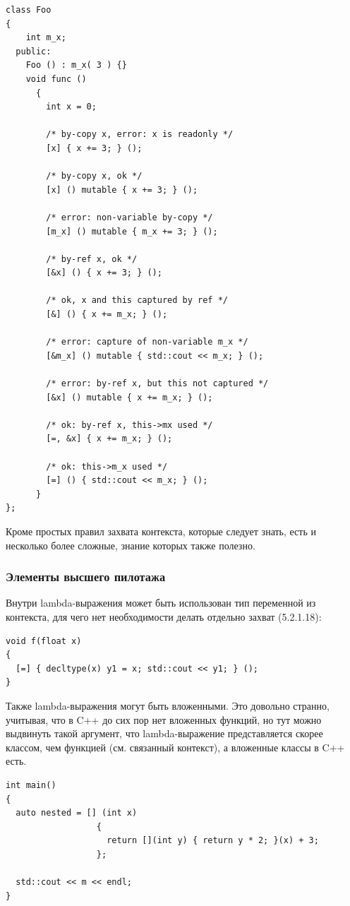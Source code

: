\documentclass[a4paper,12pt,oneside]{article}
\begin{document}
\begin{lstlisting}
class Foo
{
    int m_x;
  public:
    Foo () : m_x( 3 ) {}
    void func ()
      {
        int x = 0;

        /* by-copy x, error: x is readonly */
        [x] { x += 3; } ();
        
        /* by-copy x, ok */
        [x] () mutable { x += 3; } ();

        /* error: non-variable by-copy */
        [m_x] () mutable { m_x += 3; } (); 

        /* by-ref x, ok */
        [&x] () { x += 3; } ();

        /* ok, x and this captured by ref */
        [&] () { x += m_x; } ();

        /* error: capture of non-variable m_x */
        [&m_x] () mutable { std::cout << m_x; } (); 

        /* error: by-ref x, but this not captured */
        [&x] () mutable { x += m_x; } (); 

        /* ok: by-ref x, this->mx used */
        [=, &x] { x += m_x; } ();

        /* ok: this->m_x used */
        [=] () { std::cout << m_x; } ();
      }
};
\end{lstlisting}

Кроме простых правил захвата контекста, которые следует знать, есть и несколько более сложные, знание которых также полезно.

\subsubsection{Элементы высшего пилотажа}

Внутри lambda-выражения может быть использован тип переменной из контекста, для чего нет необходимости делать отдельно захват (5.2.1.18):

\begin{lstlisting}
void f(float x) 
{
  [=] { decltype(x) y1 = x; std::cout << y1; } ();
}
\end{lstlisting}

Также lambda-выражения могут быть вложенными. Это довольно странно, учитывая, что в C++ до сих пор нет вложенных функций, но тут можно выдвинуть такой аргумент, что lambda-выражение представляется скорее классом, чем функцией (см. связанный контекст), а вложенные классы в C++ есть.

\begin{lstlisting}
int main()
{
  auto nested = [] (int x) 
                  { 
                    return [](int y) { return y * 2; }(x) + 3; 
                  };

  std::cout << m << endl;
}
\end{lstlisting}
\end{document}

